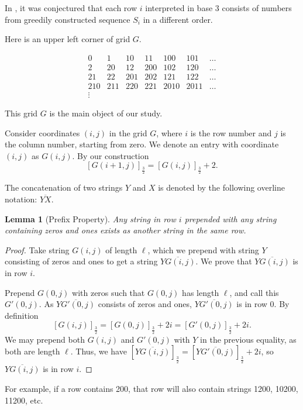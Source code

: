 \documentclass[12pt,reqno]{article}
\theoremstyle{plain}
\newtheorem{lemma}[theorem]{Lemma}
\theoremstyle{definition}
\theoremstyle{remark}
\begin{document}
In \cite{PSS}, it was conjectured that each row $i$ interpreted in base 3 consists of numbers from greedily constructed sequence $S_{i}$ in a different order. 

Here is an upper left corner of grid $G$.

\[
\begin{matrix}
    0  & 1 & 10 & 11 & 100 & 101 & \dots \\
    2 & 20 & 12 & 200 & 102 & 120 & \dots \\
    21 & 22 & 201 & 202 & 121 & 122 & \dots \\
    210 & 211 & 220 & 221 & 2010 & 2011 & \dots \\
    \vdots
\end{matrix}
\]

This grid $G$ is the main object of our study.

Consider coordinates $(i,j)$ in the grid $G$, where $i$ is the row number and $j$ is the column number, starting from zero. We denote an entry with coordinate $(i,j)$ as $G(i,j)$. By our construction 
\[[G(i+1,j)]_{\frac{3}{2}} = [G(i,j)]_{\frac{3}{2}} + 2.\]

The concatenation of two strings $Y$ and $X$ is denoted by the following overline notation: $\overline{YX}$.

\begin{lemma}[Prefix Property]
Any string in row $i$ prepended with any string containing zeros and ones exists as another string in the same row.
\label{lemma:prefix}
\end{lemma}
\begin{proof}
Take string $G(i,j)$ of length $\ell$, which we prepend with string $Y$ consisting of zeros and ones to get a string $\overline{YG(i,j)}$. We prove that $\overline{YG(i,j)}$ is in row $i$.

Prepend $G(0,j)$ with zeros such that $G(0,j)$ has length $\ell$, and call this $G'(0,j)$. As $\overline{YG'(0,j)}$ consists of zeros and ones, $\overline{YG'(0,j)}$ is in row $0$. By definition 
\[[G(i,j)]_{\frac{3}{2}} = [G(0,j)]_{\frac{3}{2}}+2i = [G'(0,j)]_{\frac{3}{2}}+2i.\]
We may prepend both $G(i,j)$ and $G'(0,j)$ with $Y$ in the previous equality, as both are length $\ell$. Thus, we have $[\overline{YG(i,j)}]_{\frac{3}{2}} = [\overline{YG'(0,j)}]_{\frac{3}{2}} + 2i$, so $\overline{YG(i,j)}$ is in row $i$.
\end{proof}

For example, if a row contains 200, that row will also contain strings 1200, 10200, 11200, etc.
\end{document}
